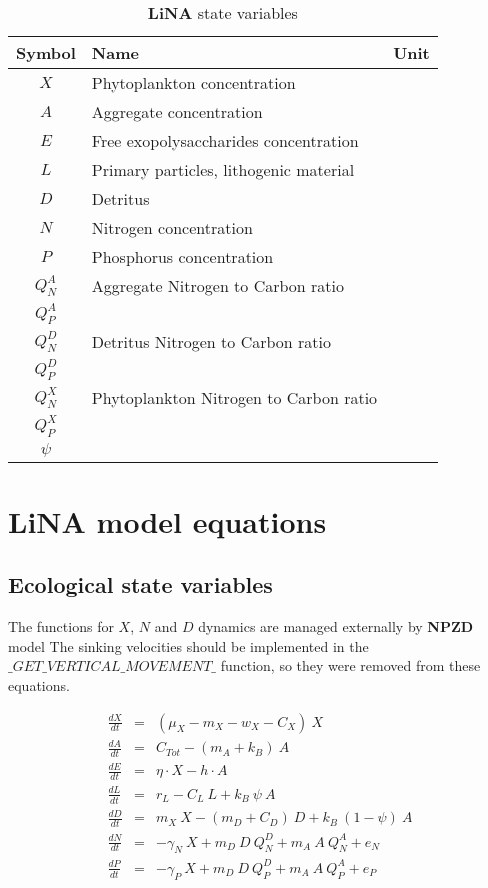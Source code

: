 \documentclass[fleqn]{article}                     %
\newcommand{\LiNA}{\textbf{LiNA} }
\begin{document}
\begin{table}[h!]
  \centering
  \caption{\LiNA state variables}
  \begin{tabular}{cll}
  \hline
    \textbf{Symbol} & \textbf{Name} & \textbf{Unit}\\ \hline
    $X$ & Phytoplankton concentration & \\
    $A$ & Aggregate concentration & \\
    $E$ & Free exopolysaccharides concentration & \\
    $L$ & Primary particles, lithogenic material & \\
    $D$ & Detritus & \\
    $N$ & Nitrogen concentration & \\
    $P$ & Phosphorus concentration & \\
    
    \hline
    $Q^A_N$ &Aggregate Nitrogen to Carbon ratio \\
    $Q^A_P$ \\
    $Q^D_N$ &Detritus Nitrogen to Carbon ratio\\
    $Q^D_P$\\
    $Q^X_N$&Phytoplankton Nitrogen to Carbon ratio\\
    $Q^X_P$\\
    $\psi$\\
  \end{tabular}
  \label{tab:stateVariables}
\end{table}


\section{\LiNA model equations}


\subsection{Ecological state variables}
The functions for $X$, $N$ and $D$ dynamics are managed externally by \textbf{NPZD} model
The sinking velocities should be implemented in the $\_GET\_VERTICAL\_MOVEMENT\_$ function, so they were removed from these equations.

\begin{eqnarray}
  \frac{dX}{dt} &=&  (\mu_X - m_X- w_X - C_X)\  X \\
  \frac{dA}{dt} &=&  C_{Tot} - (m_A + k_B) \ A\\
  \frac{dE}{dt} &=& \eta \cdot X - h\cdot A \\
  \frac{dL}{dt} &=& r_L - C_L\ L + k_B\ \psi\ A \\
  \frac{dD}{dt} &=& m_X \  X - (m_D + C_D)\ D + k_B\ (1-\psi)\ A \\
  \frac{dN}{dt} &=& -\gamma_N \ X + m_D\ D \  Q^D_N + m_A\ A\  Q^A_N + e_N\\
  \frac{dP}{dt} &=& -\gamma_P\  X + m_D\ D \  Q^D_P + m_A\ A\  Q^A_P + e_P
\end{eqnarray}
\end{document}
